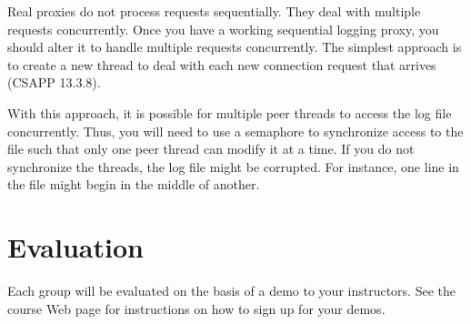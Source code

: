 \documentclass[11pt]{article}
\begin{document}
Real proxies do not process requests sequentially. They deal with
multiple requests concurrently. Once you have a working sequential
logging proxy, you should alter it to handle multiple requests
concurrently.  The simplest approach is to create a new thread to deal
with each new connection request that arrives (CSAPP 13.3.8).

With this approach, it is possible for multiple peer threads to access
the log file concurrently. Thus, you will need to use a semaphore to
synchronize access to the file such that only one peer thread can
modify it at a time.  If you do not synchronize the threads, the log
file might be corrupted.  For instance, one line in the file might
begin in the middle of another.

\section*{Evaluation}

Each group will be evaluated on the basis of a demo to your
instructors. See the course Web page for instructions on how to sign
up for your demos.
\end{document}
